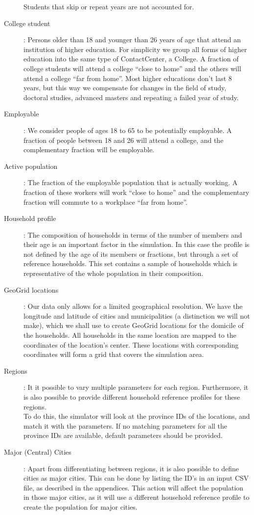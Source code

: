 \begin{description}
    		Students that skip or repeat years are not accounted for.
    \item[College student]:
        Persons older than 18 and younger than 26 years of age that attend an institution of higher education. 
        For simplicity we group all forms of higher education into the same type of ContactCenter, a College. 
        A fraction of college students will attend a college ``close to home'' and the others will attend a 
        college ``far from home''. Most higher educations don't last 8 years, but this way we compensate 
        for changes in the field of study, doctoral studies, advanced masters and repeating a failed year of study.
    \item[Employable]:
        We consider people of ages 18 to 65 to be potentially employable. A fraction of people between 18 and 26 
        will attend a college, and the complementary fraction will be employable.
    \item[Active population]:
        The fraction of the employable population that is actually working. A fraction of these workers will 
        work ``close to home'' and the complementary fraction will commute to a workplace ``far from home''.
    \item[Household profile]:
        The composition of households in terms of the number of members and their age is an important 
        factor in the simulation. In this case the profile is not defined by the age of its members or fractions, 
        but through a set of reference households. This set contains a sample of households which is 
        representative of the whole population in their composition.
    \item[GeoGrid locations]:
        Our data only allows for a limited geographical resolution. We have the longitude and latitude of cities 
        and municipalities (a distinction we will not make), which we shall use to create GeoGrid locations for 
        the domicile of the households. All households in the same location are mapped to the coordinates 
        of the location's center. These locations with corresponding coordinates will form a grid that covers 
        the simulation area.
    \item[Regions]:
        It it possible to vary multiple parameters for each region.  Furthermore, it is also possible to provide different household reference  profiles for these regions.\\
        To do this, the simulator will look at the province IDs of the locations, and match it with the parameters. If no matching parameters for all the province IDs are available, default parameters should be provided.
        
    \item[Major (Central) Cities]:
        Apart from differentiating between regions, it is also possible to define cities as major cities. This can be done by listing the ID's in an input CSV file, as described in the appendices. This action will affect the population in those major cities, as it will use a different household reference profile to create the population for major cities.

\end{description}

